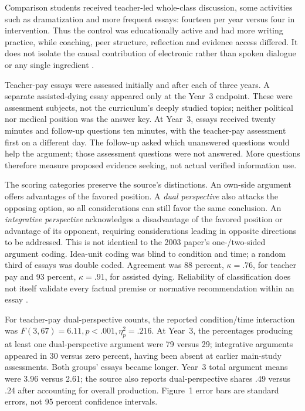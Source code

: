 Comparison students received teacher-led whole-class discussion, some
activities such as dramatization and more frequent essays: fourteen per
year versus four in intervention. Thus the control was educationally
active and had more writing practice, while coaching, peer structure,
reflection and evidence access differed. It does not isolate the causal
contribution of electronic rather than spoken dialogue or any single
ingredient
\cite[pp.~547--548,552, note~2]{KuhnCrowell2011Dialogic}.

Teacher-pay essays were assessed initially and after each of three years.
A separate assisted-dying essay appeared only at the Year~3 endpoint.
These were assessment subjects, not the curriculum's deeply studied
topics; neither political nor medical position was the answer key.
At Year~3, essays received twenty minutes and follow-up questions ten
minutes, with the teacher-pay assessment first on a different day.
The follow-up asked which unanswered questions would help the argument;
those assessment questions were not answered. More questions therefore
measure proposed evidence seeking, not actual verified information use.

The scoring categories preserve the source's distinctions. An own-side
argument offers advantages of the favored position. A \emph{dual perspective}
also attacks the opposing option, so all considerations can still favor
the same conclusion. An \emph{integrative perspective} acknowledges a
disadvantage of the favored position or advantage of its opponent, requiring
considerations leading in opposite directions to be addressed. This is
not identical to the 2003 paper's one-/two-sided argument coding.
Idea-unit coding was blind to condition and time; a random third of
essays was double coded. Agreement was 88 percent, \(\kappa=.76\),
for teacher pay and 93 percent, \(\kappa=.91\), for assisted dying.
Reliability of classification does not itself validate every factual
premise or normative recommendation within an essay
\cite[pp.~546,548--550, table~1]{KuhnCrowell2011Dialogic}.

For teacher-pay dual-perspective counts, the reported condition/time
interaction was \(F(3,67)=6.11,p<.001,\eta_p^2=.216\).
At Year~3, the percentages producing at least one dual-perspective
argument were 79 versus 29; integrative arguments appeared in 30 versus
zero percent, having been absent at earlier main-study assessments.
Both groups' essays became longer. Year~3 total argument means were
3.96 versus 2.61; the source also reports dual-perspective shares .49
versus .24 after accounting for overall production. Figure~1 error bars
are standard errors, not 95 percent confidence intervals.

